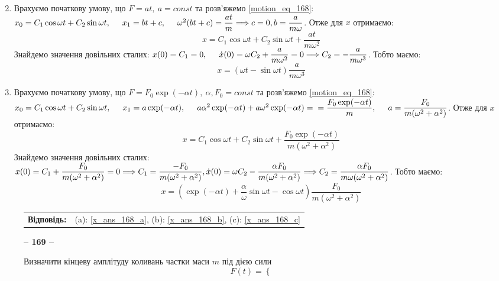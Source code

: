 \documentclass[a4paper,12pt]{article}
\newenvironment{task}[1]{\begin{figure*}[htp]\begin{framed}\begin{center}\textbf{-- {#1} --}\end{center}}{\end{framed}\end{figure*}}
\newenvironment{ans}[0]{\begin{figure*}[htp]\begin{center}\begin{tabular}{lc}\textbf{Відповідь:}\tab&}{\end{tabular}\end{center}\end{figure*}}
\newcommand\tab [1][0.5cm]{\hspace*{#1}}
\begin{document}
\begin{justify}
\begin{enumerate}[label=\alph*)]
\begin{equation}
						\label{x_ans_168_a}
					\end{equation}	
				\item Врахуємо початкову умову, що $F=at,\>a=const$ та розв'яжемо  \cref{motion_eq_168}: $\\x_0=C_1\cos\omega t+C_2\sin\omega t,\tab x_1=bt+c,\tab \omega^2(bt+c)=\dfrac{at}{m}\Longrightarrow c=0,b=\dfrac{a}{m\omega}$. Отже для $x$ отримаємо:
					\begin{equation}
						x=C_1\cos\omega t+C_2\sin\omega t+\dfrac{at}{m\omega^2}
						\label{x_168b}
					\end{equation}
					Знайдемо значення довільних сталих: $x(0)=C_1=0,\tab \dot{x}(0)=\omega C_2+\dfrac{a}{m\omega^2}=0\Longrightarrow C_2=-\dfrac{a}{m\omega^3}$.	Тобто маємо:
					\begin{equation}
						x=(\omega t-\sin\omega t)\dfrac{a}{m\omega^3}
						\label{x_ans_168_b}
					\end{equation}
				\item  Врахуємо початкову умову, що $F=F_0\exp(-\alpha t),\>\alpha,F_0=const$ та розв'яжемо  \cref{motion_eq_168}: $x_0=C_1\cos\omega t+C_2\sin\omega t,\tab x_1=a\exp(-\alpha t),\tab a\alpha^2\exp(-\alpha t)+a\omega^2\exp(-\alpha t)=\\=\dfrac{F_0\exp(-\alpha t)}m,\tab a=\dfrac{F_0}{m(\omega^2+\alpha^2)}$. Отже для $x$ отримаємо:
					\begin{equation}
						x=C_1\cos\omega t+C_2\sin\omega t+\dfrac{F_0\exp(-\alpha t)}{m(\omega^2+\alpha^2)}
					\end{equation}
					Знайдемо значення довільних сталих: $x(0)=C_1+\dfrac{F_0}{m(\omega^2+\alpha^2)}=0\Longrightarrow C_1=\dfrac{-F_0}{m(\omega^2+\alpha^2)},\\\dot{x}(0)=\omega C_2-\dfrac{\alpha F_0}{m(\omega^2+\alpha^2)}\Longrightarrow C_2=\dfrac{\alpha F_0}{m\omega(\omega^2+\alpha^2)}$.	Тобто маємо:
					\begin{equation}
						x=\left(\exp(-\alpha t)+\dfrac{\alpha}{\omega}\sin\omega t-\cos\omega t\right)\dfrac{F_0}{m(\omega^2+\alpha^2)}
						\label{x_ans_168_c}
					\end{equation}
		\end{enumerate}
 		 	\begin{ans}
				(a): \cref{x_ans_168_a}, (b): \cref{x_ans_168_b}, (c): \cref{x_ans_168_c}
			\end{ans}
		\begin{task}{169}
			Визначити кінцеву амплітуду коливань частки маси $m$ під дією сили
			$$F(t)=\left\{\begin{array}{cc}

\end{array}$$
\end{task}
\end{justify}
\end{document}
